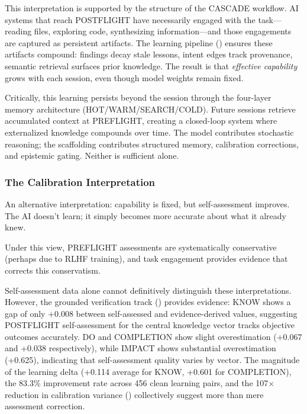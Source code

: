 This interpretation is supported by the structure of the CASCADE workflow. AI systems that reach POSTFLIGHT have necessarily engaged with the task---reading files, exploring code, synthesizing information---and those engagements are captured as persistent artifacts. The learning pipeline () ensures these artifacts compound: findings decay stale lessons, intent edges track provenance, semantic retrieval surfaces prior knowledge. The result is that \emph{effective capability} grows with each session, even though model weights remain fixed.

Critically, this learning persists beyond the session through the four-layer memory architecture (HOT/WARM/SEARCH/COLD). Future sessions retrieve accumulated context at PREFLIGHT, creating a closed-loop system where externalized knowledge compounds over time. The model contributes stochastic reasoning; the scaffolding contributes structured memory, calibration corrections, and epistemic gating. Neither is sufficient alone.

\subsubsection{The Calibration Interpretation}

An alternative interpretation: capability is fixed, but self-assessment improves. The AI doesn't learn; it simply becomes more accurate about what it already knew.

Under this view, PREFLIGHT assessments are systematically conservative (perhaps due to RLHF training), and task engagement provides evidence that corrects this conservatism.

Self-assessment data alone cannot definitively distinguish these interpretations. However, the grounded verification track () provides evidence: KNOW shows a gap of only +0.008 between self-assessed and evidence-derived values, suggesting POSTFLIGHT self-assessment for the central knowledge vector tracks objective outcomes accurately. DO and COMPLETION show slight overestimation (+0.067 and +0.038 respectively), while IMPACT shows substantial overestimation (+0.625), indicating that self-assessment quality varies by vector. The magnitude of the learning delta (+0.114 average for KNOW, +0.601 for COMPLETION), the 83.3\% improvement rate across 456 clean learning pairs, and the 107$\times$ reduction in calibration variance () collectively suggest more than mere assessment correction.

